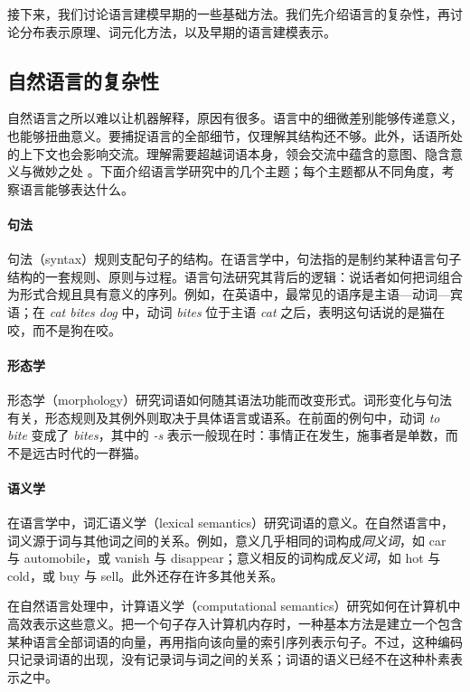 接下来，我们讨论语言建模早期的一些基础方法。我们先介绍语言的复杂性，再讨论分布表示原理、词元化方法，以及早期的语言建模表示。

\subsection{自然语言的复杂性}
自然语言之所以难以让机器解释，原因有很多。语言中的细微差别能够传递意义，也能够扭曲意义。要捕捉语言的全部细节，仅理解其结构还不够。此外，话语所处的上下文也会影响交流。理解需要超越词语本身，领会交流中蕴含的意图、隐含意义与微妙之处 \citep{wittgenstein1953philosophical, Grice_1975, krause-vossen-2024-gricean-maxims}。下面介绍语言学研究中的几个主题；每个主题都从不同角度，考察语言能够表达什么。

\paragraph{句法} 句法（syntax）规则支配句子的结构。在语言学中，句法指的是制约某种语言句子结构的一套规则、原则与过程。语言句法研究其背后的逻辑：说话者如何把词组合为形式合规且具有意义的序列。例如，在英语中，最常见的语序是主语—动词—宾语；在 {\em cat bites dog} 中，动词 {\em bites} 位于主语 {\em cat} 之后，表明这句话说的是猫在咬，而不是狗在咬。

\paragraph{形态学} 形态学（morphology）研究词语如何随其语法功能而改变形式。词形变化与句法有关，形态规则及其例外则取决于具体语言或语系。在前面的例句中，动词 {\em to bite} 变成了 {\em bites}，其中的 {\em -s} 表示一般现在时：事情正在发生，施事者是单数，而不是远古时代的一群猫。

\paragraph{语义学} 在语言学中，词汇语义学（lexical semantics）研究词语的意义。在自然语言中，词义源于词与其他词之间的关系。例如，意义几乎相同的词构成{\em 同义词}，如 car 与 automobile，或 vanish 与 disappear；意义相反的词构成{\em 反义词}，如 hot 与 cold，或 buy 与 sell。此外还存在许多其他关系。

在自然语言处理中，计算语义学（computational semantics）研究如何在计算机中高效表示这些意义。把一个句子存入计算机内存时，一种基本方法是建立一个包含某种语言全部词语的向量，再用指向该向量的索引序列表示句子。不过，这种编码只记录词语的出现，没有记录词与词之间的关系；词语的语义已经不在这种朴素表示之中。

